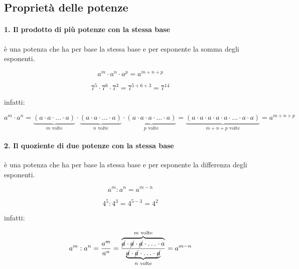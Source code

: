
\newcommand{\triaffiancati}[6]{
  \noindent
  \begin{minipage}[b]{#1\textwidth}
  #4
  \end{minipage}
  \hfill
  \begin{minipage}[b]{#2\textwidth}
  #5
  \end{minipage}
  \hfill
  \begin{minipage}[b]{#3\textwidth}
  #6
  \end{minipage}
}

\subsection{Proprietà delle potenze}

\paragraph{1. Il prodotto di più potenze con la stessa base} 
è una potenza che ha per base la stessa base e per esponente la somma 
degli esponenti.

\triaffiancati{.40}{.40}{.15}{
\[\boxed{a^m \cdot a^n \cdot a^p = a^{m+n+p}}\]
}{
\[7^5 \cdot 7^6 \cdot 7^3 = 7^{5 + 6 + 3} = 7^{14}\]
}{
infatti:
}
\[a^m \cdot a^n = 
  \underbrace{(a \cdot a \cdot \ldots \cdot a)}_{m \text{ volte}} \cdot 
  \underbrace{(a \cdot a \cdot \ldots \cdot a)}_{n \text{ volte}} \cdot 
  \underbrace{(a \cdot a \cdot a \cdot \ldots \cdot a)}_{p \text{ volte}} =
  \underbrace{(a \cdot a \cdot a \cdot a \cdot a \cdot \ldots \cdot a 
  \cdot a)}_{m+n+p\text{ volte}} = a^{m+n+p}\]

\vspace{-1.5em}
\paragraph{2. Il quoziente di due potenze con la stessa base} 
è una potenza che ha per base la stessa base e per esponente la differenza 
degli esponenti.

\triaffiancati{.40}{.40}{.15}{
\[\boxed{a^m : a^n = a^{m-n}}\]
}{
\[4^5 : 4^3 = 4^{5 - 3} = 4^2\]
}{
infatti:
}
\[
 a^m: a^n = \frac{a^m}{a^n}=
 \frac{\overbrace{\cancel{a} \cdot \cancel{a} \cdot \cancel{a} \cdot 
                  \ldots \cdot a}^{m \text{ volte}}}
 {\underbrace{\cancel{a} \cdot \cancel{a} \cdot
                  \ldots \cdot \cancel{a}}_{n \text{ volte}}}=
 a^{m-n}
\]

